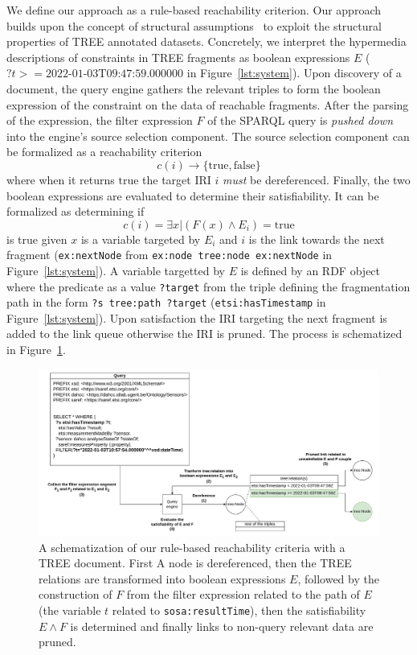 We define our approach as a rule-based reachability criterion.
Our approach builds upon the concept of structural assumptions~\cite{taelman2023} to exploit the structural properties of TREE annotated datasets.
Concretely, we interpret the hypermedia descriptions of constraints in TREE fragments as boolean expressions $E$ ($?t>= \text{2022-01-03T09:47:59.000000}$ in Figure~\ref{lst:system}).
Upon discovery of a document, the query engine gathers the relevant triples to form the boolean expression of the constraint on the data of reachable fragments.
After the parsing of the expression, the filter expression $F$ of the SPARQL query is \textit{pushed down} into the engine's source selection component.
The source selection component can be formalized as a reachability criterion~ 
\begin{equation}
c(i) \rightarrow \{\mathrm{true}, \mathrm{false}\}
\end{equation}
where when it returns $\mathrm{true}$ the target IRI $i$ \emph{must} be dereferenced.
Finally, the two boolean expressions are evaluated to determine their satisfiability.
It can be formalized as determining if 
\begin{equation}
    c(i) = \exists x | (F(x) \land E_i) = \mathrm{true}
\end{equation}
is true given $x$ is a variable targeted by $E_i$ and $i$ is the link towards the next fragment (\texttt{ex:nextNode} from \texttt{ex:node tree:node ex:nextNode} in Figure~\ref{lst:system}).
A variable targetted by $E$ is defined by an RDF object where the predicate as a value \texttt{?target} from the triple
defining the fragmentation path in the form \texttt{?s tree:path ?target} (\texttt{etsi:hasTimestamp} in Figure~\ref{lst:system}).
Upon satisfaction the IRI targeting the next fragment is added to the link queue otherwise the IRI is pruned.
The process is schematized in Figure~\ref{fig:process}.

\begin{figure}[htbp]
    \centering
    \includegraphics[width=\linewidth]{image/running_example.drawio.pdf}
    \caption{A schematization of our rule-based reachability criteria with a TREE document.
     First A node is dereferenced, then the TREE relations are transformed into boolean expressions $E$,
      followed by the construction of $F$ from the filter expression related to the path of $E$ (the variable $t$ related to \texttt{sosa:resultTime}),
       then the satisfiability $E \land F$ is determined and finally links to non-query relevant data are pruned.}
    \label{fig:process}
  \end{figure}

